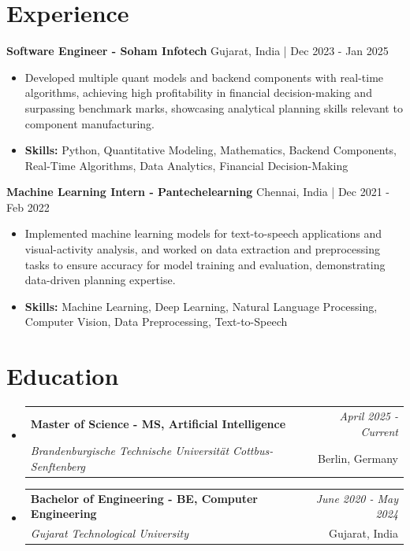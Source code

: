 \documentclass[a4paper,11pt]{article}
\makeatletter
\newcommand{\resumeSubheading}[4]{
\vspace{0.5mm}\item
    \begin{tabular*}{\linewidth}[t]{l@{\extracolsep{\fill}}r}
        \textbf{#1} & \textit{\footnotesize{#4}} \\
        \textit{\footnotesize{#3}} &  \footnotesize{#2}\\
    \end{tabular*}
    \vspace{-2.4mm}
}
\makeatother
\begin{document}
\section{\textbf{Experience}}


\vspace{1mm}
  \textbf{Software Engineer - Soham Infotech} \hfill Gujarat, India | Dec 2023 - Jan 2025
\vspace{-1.5mm} %
\begin{itemize}
  \item Developed multiple quant models and backend components with real-time algorithms, achieving high profitability in financial decision-making and surpassing benchmark marks, showcasing analytical planning skills relevant to component manufacturing.

\vspace{-2mm}
  \item \textbf{Skills:} Python, Quantitative Modeling, Mathematics, Backend Components, Real-Time Algorithms, Data Analytics, Financial Decision-Making
\end{itemize}

\vspace{1mm}
  \textbf{Machine Learning Intern - Pantechelearning} \hfill Chennai, India | Dec 2021 - Feb 2022
\vspace{-1.5mm} %
\begin{itemize}
  \item Implemented machine learning models for text-to-speech applications and visual-activity analysis, and worked on data extraction and preprocessing tasks to ensure accuracy for model training and evaluation, demonstrating data-driven planning expertise.
\vspace{-2mm}
  \item \textbf{Skills:} Machine Learning, Deep Learning, Natural Language Processing, Computer Vision, Data Preprocessing, Text-to-Speech
\end{itemize}\section{\textbf{Education}}
\vspace{-0.4mm}

\begin{itemize}[leftmargin=0.15in, label={}]
\resumeSubheading
{Master of Science - MS, Artificial Intelligence }{Berlin, Germany}
{Brandenburgische Technische Universität Cottbus-Senftenberg  }{April 2025 - Current}

\vspace{1.0mm} %
\resumeSubheading
{Bachelor of Engineering - BE, Computer Engineering  }{Gujarat, India}
{Gujarat Technological University }{June 2020 - May 2024}

\end{itemize}
\end{document}
